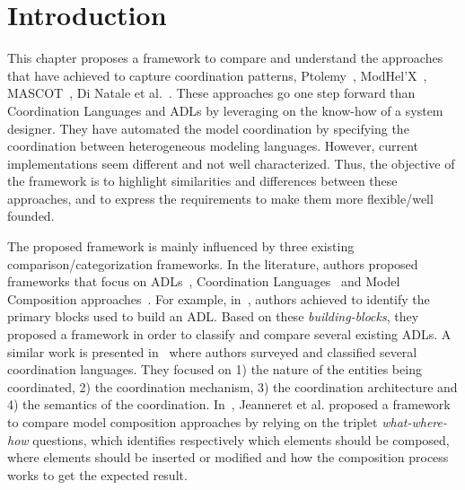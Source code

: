 \section{Introduction}
This chapter proposes a framework to compare and understand the approaches that have achieved to capture coordination patterns, \ie Ptolemy~\cite{ptoleframebib}, ModHel'X~\cite{modhelxbib}, MASCOT~\cite{mascotbib}, Di Natale et al.~\cite{dinatale}. These approaches go one step forward than Coordination Languages and ADLs by leveraging on the know-how of a system designer. They have automated the model coordination by specifying the coordination between heterogeneous modeling languages. However, current implementations seem different and not well characterized. Thus, the objective of the framework is to highlight similarities and differences between these approaches, and to express the requirements to make them more flexible/well founded.

The proposed framework is mainly influenced by three existing comparison/categorization frameworks. In the literature, authors proposed frameworks that focus on ADLs~\cite{frameadlsbib}, Coordination Languages~\cite{coordmodels} and Model Composition approaches~\cite{framecompoas}. For example, in~\cite{frameadlsbib}, authors achieved to identify the primary blocks used to build an ADL. Based on these \emph{building-blocks}, they proposed a framework in order to classify and compare several existing ADLs. A similar work is presented in~\cite{coordmodels} where authors surveyed and classified several coordination languages. They focused on 1) the nature of the entities being coordinated, 2) the coordination mechanism, 3) the coordination architecture and 4) the semantics of the coordination. In~\cite{framecompoas}, Jeanneret et al. proposed a framework to compare model composition approaches by relying on the triplet \emph{what-where-how} questions, which identifies respectively which elements should be composed, where elements should be inserted or modified and how the composition process works to get the expected result. 

